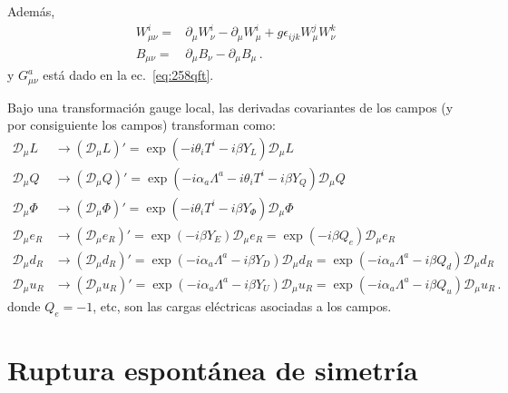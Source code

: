 Además,
\begin{align}
  W_{\mu \nu}^i=&\partial_\mu W_\nu^i -\partial_\mu W_\mu^i+ g \epsilon_{ijk}W_\mu^j W_\nu^k \nonumber\\
  B_{\mu \nu}=&\partial_\mu B_\nu -\partial_\mu B_\mu\,.
\end{align}
y $G_{\mu\nu}^a$ está dado en la ec.~\eqref{eq:258qft}.

Bajo una transformación gauge local, las derivadas covariantes de los campos (y por consiguiente los campos) transforman como:
\begin{align}
  \mathcal{D}_\mu L&\to\left(\mathcal{D}_\mu L\right)'=\exp\left(-i\theta_iT^i-i\beta Y_L\right)\mathcal{D}_\mu L\nonumber\\
  \mathcal{D}_\mu Q&\to\left(\mathcal{D}_\mu Q\right)'=\exp\left(-i\alpha_a\Lambda^a-i\theta_iT^i-i\beta Y_Q\right)\mathcal{D}_\mu Q\nonumber\\
  \mathcal{D}_\mu \Phi&\to\left(\mathcal{D}_\mu \Phi\right)'=\exp\left(-i\theta_iT^i-i\beta Y_\Phi\right)\mathcal{D}_\mu \Phi\nonumber\\
  \mathcal{D}_\mu e_R&\to\left(\mathcal{D}_\mu e_R\right)'=\exp\left(-i\beta Y_{E}\right)\mathcal{D}_\mu e_R=\exp\left(-i\beta Q_{e}\right)\mathcal{D}_\mu e_R\nonumber\\
  \mathcal{D}_\mu d_R&\to\left(\mathcal{D}_\mu d_R\right)'=\exp\left(-i\alpha_a\Lambda^a-i\beta Y_{D}\right)\mathcal{D}_\mu d_R=\exp\left(-i\alpha_a\Lambda^a-i\beta Q_{d}\right)\mathcal{D}_\mu d_R\nonumber\\
  \mathcal{D}_\mu u_R&\to\left(\mathcal{D}_\mu u_R\right)'=\exp\left(-i\alpha_a\Lambda^a-i\beta Y_{U}\right)\mathcal{D}_\mu u_R=\exp\left(-i\alpha_a\Lambda^a-i\beta Q_{u}\right)\mathcal{D}_\mu u_R\,.
\end{align}
donde $Q_{e}=-1$, etc, son las cargas eléctricas asociadas a los campos.


\section{Ruptura espontánea de simetría}
\label{sec:rupt-espont-de}

